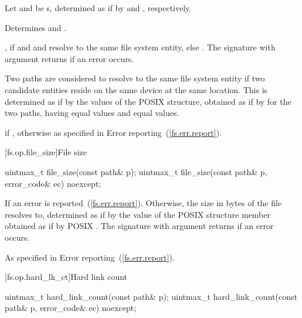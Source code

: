 \begin{itemdescr}
\pnum
Let  and  be s, determined
as if by  and , respectively.

\pnum
\effects Determines  and .

\pnum
\returns {}, if  and  and  resolve to the same file
  system entity, else . The signature with argument 
  returns  if an error occurs.

\pnum
Two paths are considered to resolve to the same file system entity if two
  candidate entities reside on the same device at the same location. This is
  determined as if by the values of the POSIX  structure,
  obtained as if by  for the two paths, having equal  values
  and equal  values.

\pnum
\throws {} if ,
  otherwise as specified in Error reporting~(\ref{fs.err.report}).
\end{itemdescr}


[fs.op.file_size]{File size}

%
\begin{itemdecl}
uintmax_t file_size(const path& p);
uintmax_t file_size(const path& p, error_code& ec) noexcept;
\end{itemdecl}

\begin{itemdescr}
\pnum
\returns If 
  an error is reported~(\ref{fs.err.report}). Otherwise, the size in bytes of the file
   resolves to, determined as if by the value of the POSIX 
  structure member  obtained as if by POSIX .
   The signature
  with argument  returns 
  if an error occurs.

\pnum
\throws As specified in Error reporting~(\ref{fs.err.report}).
\end{itemdescr}


[fs.op.hard_lk_ct]{Hard link count}

%
\begin{itemdecl}
uintmax_t hard_link_count(const path& p);
uintmax_t hard_link_count(const path& p, error_code& ec) noexcept;
\end{itemdecl}

